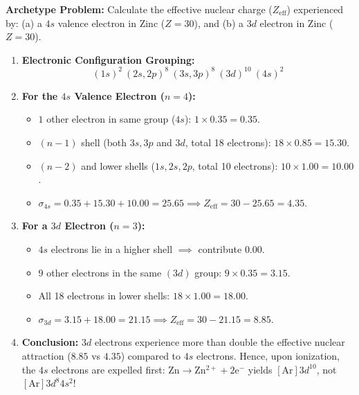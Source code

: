 \documentclass[10pt,a4paper]{article}
\begin{document}
\begin{usecasebox}
\textbf{Archetype Problem:} Calculate the effective nuclear charge ($Z_{\text{eff}}$) experienced by: (a) a $4s$ valence electron in Zinc ($Z=30$), and (b) a $3d$ electron in Zinc ($Z=30$).
\begin{enumerate}
  \item \textbf{Electronic Configuration Grouping:}
  \begin{equation*}
    (1s)^2 \ (2s, 2p)^8 \ (3s, 3p)^8 \ (3d)^{10} \ (4s)^2
  \end{equation*}
  \item \textbf{For the $4s$ Valence Electron ($n=4$):}
  \begin{itemize}
    \item $1$ other electron in same group ($4s$): $1 \times 0.35 = 0.35$.
    \item $(n-1)$ shell (both $3s, 3p$ and $3d$, total 18 electrons): $18 \times 0.85 = 15.30$.
    \item $(n-2)$ and lower shells ($1s, 2s, 2p$, total 10 electrons): $10 \times 1.00 = 10.00$.
    \item $\sigma_{4s} = 0.35 + 15.30 + 10.00 = 25.65 \implies Z_{\text{eff}} = 30 - 25.65 = \mathbf{4.35}$.
  \end{itemize}
  \item \textbf{For a $3d$ Electron ($n=3$):}
  \begin{itemize}
    \item $4s$ electrons lie in a higher shell $\implies$ contribute $0.00$.
    \item $9$ other electrons in the same $(3d)$ group: $9 \times 0.35 = 3.15$.
    \item All 18 electrons in lower shells: $18 \times 1.00 = 18.00$.
    \item $\sigma_{3d} = 3.15 + 18.00 = 21.15 \implies Z_{\text{eff}} = 30 - 21.15 = \mathbf{8.85}$.
  \end{itemize}
  \item \textbf{Conclusion:} $3d$ electrons experience more than double the effective nuclear attraction ($8.85$ vs $4.35$) compared to $4s$ electrons. Hence, upon ionization, the $4s$ electrons are expelled first: $\mathrm{Zn \to Zn^{2+} + 2e^-}$ yields $[\mathrm{Ar}] 3d^{10}$, not $[\mathrm{Ar}] 3d^8 4s^2$!
\end{enumerate}
\end{usecasebox}
\end{document}

